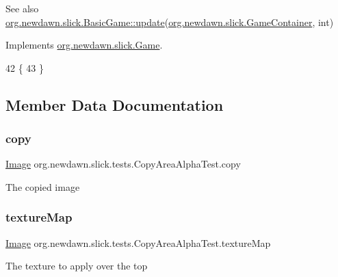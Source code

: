 \begin{DoxySeeAlso}{See also}
\mbox{\hyperlink{classorg_1_1newdawn_1_1slick_1_1_basic_game_acfe6fa05aef83bff1631af91a3e4bd20}{org.\+newdawn.\+slick.\+Basic\+Game\+::update}}(\mbox{\hyperlink{classorg_1_1newdawn_1_1slick_1_1_game_container}{org.\+newdawn.\+slick.\+Game\+Container}}, int) 
\end{DoxySeeAlso}


Implements \mbox{\hyperlink{interfaceorg_1_1newdawn_1_1slick_1_1_game_ab07b2e9463ee4631620dde0de25bdee8}{org.\+newdawn.\+slick.\+Game}}.


\begin{DoxyCode}
42                                   \{
43     \}
\end{DoxyCode}


\subsection{Member Data Documentation}
\mbox{\label{classorg_1_1newdawn_1_1slick_1_1tests_1_1_copy_area_alpha_test_a65e4d5c340fc8e416483cfb8e9cce6be}} 
\subsubsection{\texorpdfstring{copy}{copy}}
{\footnotesize\ttfamily \mbox{\hyperlink{classorg_1_1newdawn_1_1slick_1_1_image}{Image}} org.\+newdawn.\+slick.\+tests.\+Copy\+Area\+Alpha\+Test.\+copy\hspace{0.3cm}{\ttfamily [private]}}

The copied image \mbox{\label{classorg_1_1newdawn_1_1slick_1_1tests_1_1_copy_area_alpha_test_a3ac052d3b96d0a06b587b856f390f0bd}} 
\subsubsection{\texorpdfstring{texture\+Map}{textureMap}}
{\footnotesize\ttfamily \mbox{\hyperlink{classorg_1_1newdawn_1_1slick_1_1_image}{Image}} org.\+newdawn.\+slick.\+tests.\+Copy\+Area\+Alpha\+Test.\+texture\+Map\hspace{0.3cm}{\ttfamily [private]}}

The texture to apply over the top 